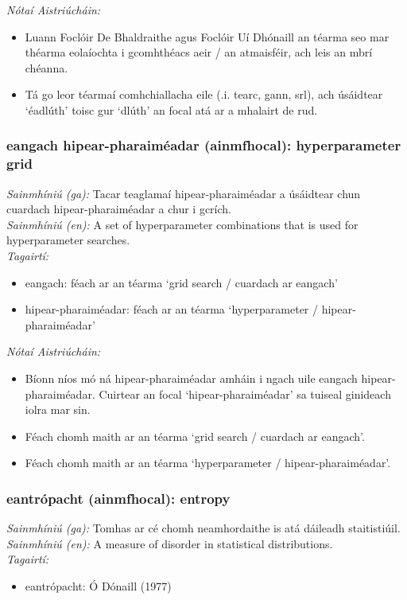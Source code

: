 \documentclass{article}
\begin{document}
 \noindent \textit{Nótaí Aistriúcháin:}
\begin{itemize}
	\item Luann Foclóir De Bhaldraithe agus Foclóir Uí Dhónaill an téarma seo mar théarma eolaíochta i gcomhthéacs aeir / an atmaisféir, ach leis an mbrí chéanna.
	\item Tá go leor téarmaí comhchiallacha eile (.i. tearc, gann, srl), ach úsáidtear `éadlúth' toisc gur `dlúth' an focal atá ar a mhalairt de rud.
\end{itemize}


\subsubsection*{eangach hipear-pharaiméadar (ainmfhocal): hyperparameter grid}
 \noindent \textit{Sainmhíniú (ga):} Tacar teaglamaí hipear-pharaiméadar a úsáidtear chun cuardach hipear-pharaiméadar a chur i gcrích.
\\
 \noindent \textit{Sainmhíniú (en):} A set of hyperparameter combinations that is used for hyperparameter searches.
\\
 \noindent \textit{Tagairtí:}
\begin{itemize}
	\item eangach: féach ar an téarma `grid search / cuardach ar eangach'
	\item hipear-pharaiméadar: féach ar an téarma `hyperparameter / hipear-pharaiméadar'
\end{itemize}

 \noindent \textit{Nótaí Aistriúcháin:}
\begin{itemize}
	\item Bíonn níos mó ná hipear-pharaiméadar amháin i ngach uile eangach hipear-pharaiméadar. Cuirtear an focal `hipear-pharaiméadar' sa tuiseal ginideach iolra mar sin.
	\item Féach chomh maith ar an téarma `grid search / cuardach ar eangach'.
	\item Féach chomh maith ar an téarma `hyperparameter / hipear-pharaiméadar'.
\end{itemize}


\subsubsection*{eantrópacht (ainmfhocal): entropy}
 \noindent \textit{Sainmhíniú (ga):} Tomhas ar cé chomh neamhordaithe is atá dáileadh staitistiúil.
\\
 \noindent \textit{Sainmhíniú (en):} A measure of disorder in statistical distributions.
\\
 \noindent \textit{Tagairtí:}
\begin{itemize}
	\item eantrópacht: Ó Dónaill (1977) \cite{odonaill}
\end{itemize}
\end{document}
